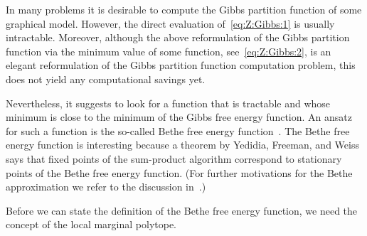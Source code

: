 \documentclass[journal, twocolumn]{IEEEtran}
\newcommand{\?}{\mathrm{?}}
\begin{document}
In many problems it is desirable to compute the Gibbs partition function of
some graphical model. However, the direct evaluation of~\eqref{eq:Z:Gibbs:1}
is usually intractable. Moreover, although the above reformulation of the
Gibbs partition function via the minimum value of some function,
see~\eqref{eq:Z:Gibbs:2}, is an elegant reformulation of the Gibbs partition
function computation problem, this does not yield any computational savings
yet.

Nevertheless, it suggests to look for a function that is tractable and whose
minimum is close to the minimum of the Gibbs free energy function. An ansatz
for such a function is the so-called Bethe free energy
function~\cite{Yedidia:Freeman:Weiss:05:1}. The Bethe free energy function is
interesting because a theorem by Yedidia, Freeman, and
Weiss~\cite{Yedidia:Freeman:Weiss:05:1} says that fixed points of the
sum-product algorithm correspond to stationary points of the Bethe free energy
function. (For further motivations for the Bethe approximation we refer to the
discussion in~\cite{Yedidia:Freeman:Weiss:05:1, Yedidia:01:1,
  Wainwright:Jordan:08:1}.)

Before we can state the definition of the Bethe free energy function, we need
the concept of the local marginal polytope.
\end{document}

